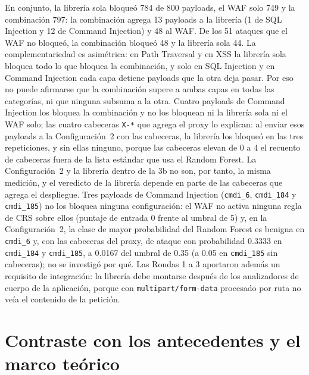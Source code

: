 En conjunto, la librería sola bloqueó 784 de 800 payloads, el WAF solo 749 y la combinación 797: la
combinación agrega 13 payloads a la librería (1 de SQL Injection y 12 de Command Injection) y 48
al WAF. De los 51 ataques que el WAF no bloqueó, la combinación bloqueó 48 y la librería sola 44. La
complementariedad es asimétrica: en Path Traversal y en XSS la librería sola bloquea todo lo que
bloquea la combinación, y solo en SQL Injection y en Command Injection cada capa detiene payloads
que la otra deja pasar. Por eso no puede afirmarse que la combinación supere a ambas capas en todas
las categorías, ni que ninguna subsuma a la otra. Cuatro payloads de Command Injection los bloquea
la combinación y no los bloquean ni la librería sola ni el WAF solo; las cuatro cabeceras
\texttt{X-*} que agrega el proxy lo explican: al enviar esos payloads a la Configuración~2 con las
cabeceras, la librería los bloqueó en las tres repeticiones, y sin ellas ninguno, porque las
cabeceras elevan de 0 a 4 el recuento de cabeceras fuera de la lista estándar que usa el Random
Forest. La Configuración~2 y la librería dentro de la 3b no son, por tanto, la misma medición, y el
veredicto de la librería depende en parte de las cabeceras que agrega el despliegue. Tres payloads
de Command Injection (\texttt{cmdi\_6}, \texttt{cmdi\_184} y \texttt{cmdi\_185}) no los bloquea
ninguna configuración: el WAF no activa ninguna regla de CRS sobre ellos (puntaje de entrada 0
frente al umbral de 5) y, en la Configuración~2, la clase de mayor probabilidad del Random Forest
es benigna en \texttt{cmdi\_6} y, con las cabeceras del proxy, de ataque con probabilidad 0.3333 en
\texttt{cmdi\_184} y \texttt{cmdi\_185}, a 0.0167 del umbral de 0.35 (a 0.05 en \texttt{cmdi\_185}
sin cabeceras); no se investigó por qué. Las Rondas 1 a 3 aportaron
además un requisito de integración: la librería debe montarse después de los analizadores de
cuerpo de la aplicación, porque con \texttt{multipart/form-data} procesado por ruta no veía el
contenido de la petición.

\section{Contraste con los antecedentes y el marco teórico}


